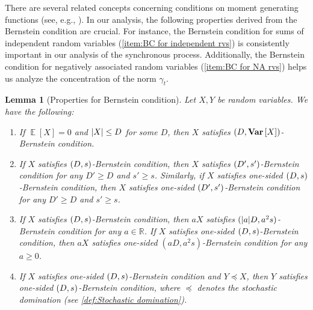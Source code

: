 \documentclass[letterpaper,11pt]{article}
\newtheorem{lemma}[theorem]{Lemma}
\DeclareMathOperator*{\E}{\mathbb{E}}
\DeclareMathOperator*{\Var}{\mathbf{Var}}
\newcommand{\Real}{\mathbb{R}}
\newcommand{\alphanorm}{\gamma}
\newcommand{\bounded}{D}
\newcommand{\variance}{s}
\begin{document}
  There are several related concepts concerning conditions on moment generating functions (see, e.g., \cite{HDS19}).
  In our analysis, the following properties derived from the Bernstein condition are crucial. 
  For instance, the Bernstein condition for sums of independent random variables (\cref{item:BC for independent rvs}) is consistently important in our analysis of the synchronous process.
  Additionally, the Bernstein condition for negatively associated random variables (\cref{item:BC for NA rvs}) helps us analyze the concentration of the norm $\alphanorm_t$.
  \begin{lemma}[Properties for Bernstein condition]
        \label{lem:Bernstein condition}
        Let $X,Y$ be random variables. We have the following:
        \begin{enumerate}
            \renewcommand{\labelenumi}{(\roman{enumi})}
            \item \label{item:Bernstein condition for bounded random variables}
            If $\E[X]=0$ and $\abs{X}\leq \bounded$ for some $\bounded$, then $X$ satisfies $\qty(\bounded,\Var\qty[X])$-Bernstein condition.
            \item \label{item:Bernstein condition 1}
            If $X$ satisfies $\qty(\bounded,\variance)$-Bernstein condition, then
            $X$ satisfies $\qty(\bounded',\variance')$-Bernstein condition for any 
            $\bounded' \ge \bounded$ and $\variance' \ge \variance$.
            Similarly, if $X$ satisfies one-sided $\qty(\bounded,\variance)$-Bernstein condition, then
            $X$ satisfies one-sided $\qty(\bounded',\variance')$-Bernstein condition for any 
            $\bounded' \ge \bounded$ and $\variance' \ge \variance$.
            \item \label{item:Bernstein condition 2}
            If $X$ satisfies $\qty(\bounded,\variance)$-Bernstein condition, then $aX$ satisfies $(\abs{a}\bounded,a^2\variance)$-Bernstein condition for any $a \in \Real$.
            If $X$ satisfies one-sided $\qty(\bounded,\variance)$-Bernstein condition, then $aX$ satisfies one-sided $(a \bounded,a^2\variance)$-Bernstein condition for any $a \geq 0$.
            \item \label{item:dominated Bernstein condition}
            If $X$ satisfies one-sided $\qty(\bounded,\variance)$-Bernstein condition and $Y\preceq X$, 
            then $Y$ satisfies one-sided $\qty(\bounded, \variance)$-Bernstein condition, where $\preceq$ denotes the stochastic domination (see \cref{def:Stochastic domination}).

\end{enumerate}
\end{lemma}
\end{document}
